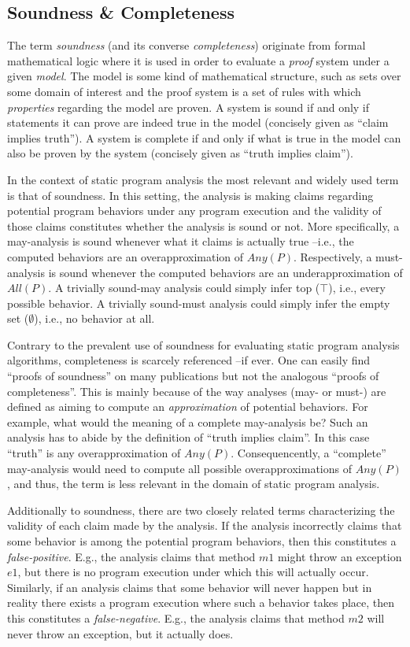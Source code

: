 \subsection{Soundness \& Completeness}

The term \emph{soundness} (and its converse \emph{completeness}) originate from
formal mathematical logic where it is used in order to evaluate a \emph{proof}
system under a given \emph{model}. The model is some kind of mathematical
structure, such as sets over some domain of interest and the proof system is a
set of rules with which \emph{properties} regarding the model are proven. A
system is sound if and only if statements it can prove are indeed true in the
model (concisely given as ``claim implies truth''). A system is complete if and
only if what is true in the model can also be proven by the system (concisely
given as ``truth implies claim'').

In the context of static program analysis the most relevant and widely used
term is that of soundness. In this setting, the analysis is making claims
regarding potential program behaviors under any program execution and the
validity of those claims constitutes whether the analysis is sound or not. More
specifically, a may-analysis is sound whenever what it claims is actually true
--i.e., the computed behaviors are an overapproximation of $Any(P)$.
Respectively, a must-analysis is sound whenever the computed behaviors are an
underapproximation of $All(P)$. A trivially sound-may analysis could simply
infer top ($\top$), i.e., every possible behavior. A trivially sound-must
analysis could simply infer the empty set ($\emptyset$), i.e., no behavior at
all.

Contrary to the prevalent use of soundness for evaluating static program
analysis algorithms, completeness is scarcely referenced --if ever. One can
easily find ``proofs of soundness'' on many publications but not the analogous
``proofs of completeness''. This is mainly because of the way analyses (may- or
must-) are defined as aiming to compute an \emph{approximation} of potential
behaviors. For example, what would the meaning of a complete may-analysis be?
Such an analysis has to abide by the definition of ``truth implies claim''. In
this case ``truth'' is any overapproximation of $Any(P)$. Consequencently, a
``complete'' may-analysis would need to compute all possible overapproximations
of $Any(P)$, and thus, the term is less relevant in the domain of static
program analysis.

Additionally to soundness, there are two closely related terms characterizing
the validity of each claim made by the analysis. If the analysis incorrectly
claims that some behavior is among the potential program behaviors, then this
constitutes a \emph{false-positive}. E.g., the analysis claims that method $m1$
might throw an exception $e1$, but there is no program execution under which
this will actually occur. Similarly, if an analysis claims that some behavior
will never happen but in reality there exists a program execution where such a
behavior takes place, then this constitutes a \emph{false-negative}. E.g., the
analysis claims that method $m2$ will never throw an exception, but it actually
does.

